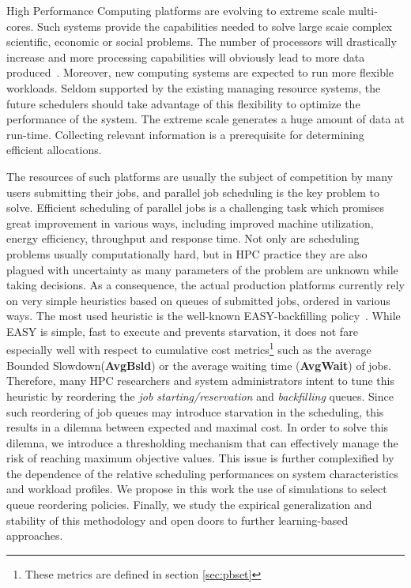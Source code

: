 High Performance Computing platforms are evolving to extreme scale multi-cores.
Such systems provide the capabilities needed to solve large scaie complex
scientific, economic or social problems.  The number of processors will
drastically increase and more processing capabilities will obviously lead to
more data produced~\cite{DOEASCAC}.  Moreover, new computing systems are
expected to run more flexible workloads.  Seldom supported by the existing
managing resource systems, the future schedulers should take advantage of this
flexibility to optimize the performance of the system.  The extreme scale
generates a huge amount of data at run-time. Collecting relevant information is
a prerequisite for determining efficient allocations.

The resources of such platforms are usually the subject of competition by
many users submitting their jobs, and parallel job scheduling is the key
problem to solve. Efficient scheduling of parallel jobs is a challenging task
which promises great improvement in various ways, including improved machine
utilization, energy efficiency, throughput and response time. Not only are
scheduling problems usually computationally hard, but in HPC practice they are
also plagued with uncertainty as many parameters of the problem are unknown
while taking decisions. As a consequence, the actual production platforms
currently rely on very simple heuristics based on queues of submitted jobs,
ordered in various ways.  The most used heuristic is the well-known
EASY-backfilling policy~\cite{easy}. While EASY is simple, fast to execute and
prevents starvation, it does not fare especially well with respect to
cumulative cost metrics\footnote{These metrics are defined in section
\ref{sec:pbset}} such as the average Bounded Slowdown(\textbf{AvgBsld}) or the
average waiting time (\textbf{AvgWait}) of jobs.  Therefore, many HPC
researchers and system administrators intent to tune this heuristic by
reordering the \textit{job starting/reservation} and \textit{backfilling}
queues. Since such reordering of job queues may introduce starvation in the
scheduling, this results in a dilemna between expected and maximal cost. In
order to solve this dilemna, we introduce a thresholding mechanism that can
effectively manage the risk of reaching maximum objective values. This issue is
further complexified by the dependence of the relative scheduling performances
on system characteristics and workload profiles. We propose in this work the
use of simulations to select queue reordering policies.  Finally, we study the
expirical generalization and stability of this methodology and open doors to
further learning-based approaches.

